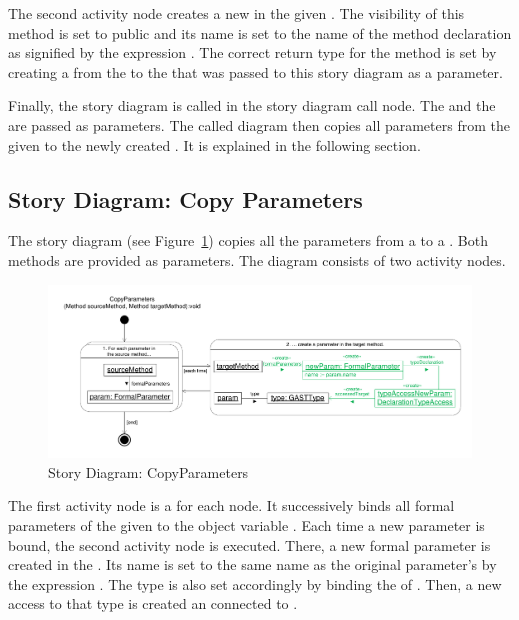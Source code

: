 The second activity node creates a new  in the given . The visibility of this method is set to public and its name is set to the name of the method declaration as signified by the expression . The correct return type for the method is set by creating a  from the  to the  that was passed to this story diagram as a parameter.

Finally, the story diagram  is called in the story diagram call node. The  and the  are passed as parameters. The called diagram then copies all parameters from the given  to the newly created . It is explained in the following section.

\subsection{Story Diagram: Copy Parameters} \label{sec:SDCopyParameters}

The story diagram  (see Figure~\ref{fig:SDCopyParameters}) copies all the parameters from a  to a . Both methods are provided as parameters. The diagram consists of two activity nodes.

\begin{figure}[hbtp]
\centering
\includegraphics[width=0.9\linewidth]{./figures/SDCopyParameters}
\caption{Story Diagram: CopyParameters}
\label{fig:SDCopyParameters}
\end{figure}

The first activity node is a for each node. It successively binds all formal parameters of the given  to the object variable . Each time a new parameter is bound, the second activity node is executed. There, a new formal parameter  is created in the . Its name is set to the same name as the original parameter's by the expression . The type is also set accordingly by binding the  of . Then, a new access to that type is created an connected to .